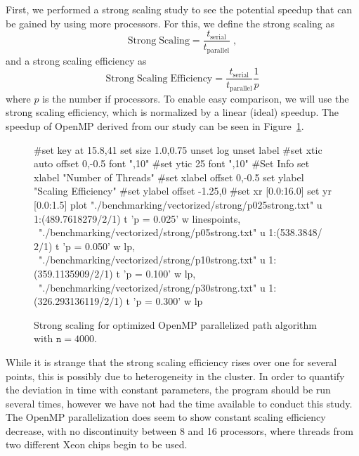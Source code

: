 \documentclass[11pt]{article}
\begin{document}
\noindent First, we performed a strong scaling study to see the potential speedup that can be gained by using more processors. For this, we define the strong scaling as
\begin{equation}
\mathrm{Strong \; Scaling} = \frac{t_{\mathrm{serial}}}{t_{\mathrm{parallel}}} \; ,
\label{strongscale}
\end{equation}
and a strong scaling efficiency as 
\begin{equation}
\mathrm{Strong \; Scaling \; Efficiency} = \frac{t_{\mathrm{serial}}}{t_{\mathrm{parallel}}} \frac{1}{p} 
\label{normss}
\end{equation}
where $p$ is the number if processors. To enable easy comparison, we will use the strong scaling efficiency, which is normalized by a linear (ideal) speedup. The speedup of OpenMP derived from our study can be seen in Figure~\ref{omp_ss}.
\begin{figure}[h!]
	\begin{center}
		\begin{gnuplot}[terminal=cairolatex, terminaloptions= color] 
			#set key at 15.8,41
			set size 1.0,0.75              
			unset log                          
			unset label                          
			#set xtic auto offset 0,-0.5 font ",10"                     
			#set ytic 25 font ",10" 
			#Set Info
			set xlabel "Number of Threads"
			#set xlabel offset 0,-0.5
			set ylabel "Scaling Efficiency"
			#set ylabel offset -1.25,0
			#set xr [0.0:16.0]
			set yr [0.0:1.5]
			plot "./benchmarking/vectorized/strong/p025strong.txt" u 1:(489.7618279/$2/$1) t 'p = 0.025' w linespoints, \
			"./benchmarking/vectorized/strong/p05strong.txt" u 1:(538.3848/$2/$1) t 'p = 0.050' w lp, \
			"./benchmarking/vectorized/strong/p10strong.txt" u 1:(359.1135909/$2/$1) t 'p = 0.100' w lp, \
			"./benchmarking/vectorized/strong/p30strong.txt" u 1:(326.293136119/$2/$1) t 'p = 0.300' w lp
		\end{gnuplot}
		\caption{Strong scaling for optimized OpenMP parallelized path algorithm with $\mathtt{n} = 4000$.}
		\label{omp_ss}
	\end{center}
\end{figure}
\noindent While it is strange that the strong scaling efficiency rises over one for several points, this is possibly due to heterogeneity in the cluster. In order to quantify the deviation in time with constant parameters, the program should be run several times, however we have not had the time available to conduct this study. The OpenMP parallelization does seem to show constant scaling efficiency decrease, with no discontinuity between 8 and 16 processors, where threads from two different Xeon chips begin to be used.
\end{document}
